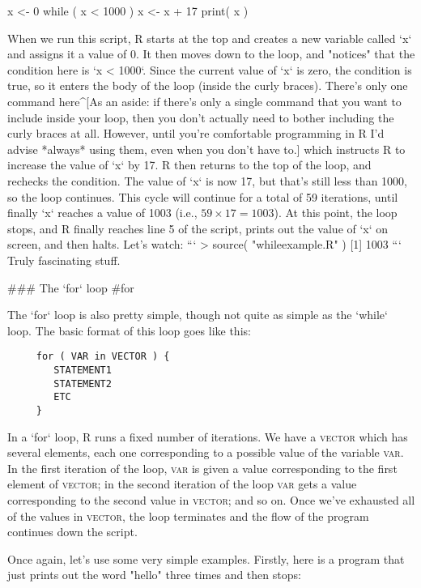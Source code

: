 \begin{script}
x <- 0
while ( x < 1000 ) {
  x <- x + 17
}
print( x )
\end{script}
When we run this script, R starts at the top and creates a new variable called `x` and assigns it a value of 0. It then moves down to the loop, and "notices" that the condition here is `x < 1000`. Since the current value of `x` is zero, the condition is true, so it enters the body of the loop (inside the curly braces). There's only one command here^[As an aside: if there's only a single command that you want to include inside your loop, then you don't actually need to bother including the curly braces at all. However, until you're comfortable programming in R I'd advise *always* using them, even when you don't have to.] which instructs R to increase the value of `x` by 17. R then returns to the top of the loop, and rechecks the condition. The value of `x` is now 17, but that's still less than 1000, so the loop continues. This cycle will continue for a total of 59 iterations, until finally `x` reaches a value of 1003 (i.e., $59 \times 17 = 1003$). At this point, the loop stops, and R finally reaches line 5 of the script, prints out the value of `x` on screen, and then halts. Let's watch:
```
> source( "whileexample.R" )
[1] 1003
```
Truly fascinating stuff.

### The `for` loop {#for} 

The `for` loop is also pretty simple, though not quite as simple as the `while` loop. The basic format of this loop goes like this:
\begin{verbatim}
     for ( VAR in VECTOR ) {
        STATEMENT1
        STATEMENT2
        ETC
     }
\end{verbatim} 
In a `for` loop, R runs a fixed number of iterations. We have a \textsc{vector} which has several elements, each one corresponding to a possible value of the variable \textsc{var}. In the first iteration of the loop, \textsc{var} is given a value corresponding to the first element of \textsc{vector}; in the second iteration of the loop \textsc{var} gets a value corresponding to the second value in \textsc{vector}; and so on. Once we've exhausted all of the values in \textsc{vector}, the loop terminates and the flow of the program continues down the script. 

Once again, let's use some very simple examples. Firstly, here is a program that just prints out the word "hello" three times and then stops:

